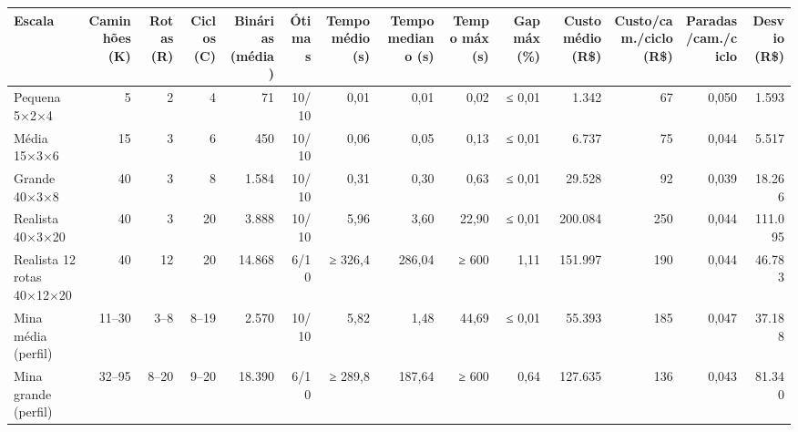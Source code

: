 \begin{tabular}{lrrrrrrrrrrrrr}
\toprule
Escala & Caminhões (K) & Rotas (R) & Ciclos (C) & Binárias (média) & Ótimas & Tempo médio (s) & Tempo mediano (s) & Tempo máx (s) & Gap máx (\%) & Custo médio (R\$) & Custo/cam./ciclo (R\$) & Paradas/cam./ciclo & Desvio (R\$) \\
\midrule
Pequena 5×2×4 & 5 & 2 & 4 & 71 & 10/10 & 0,01 & 0,01 & 0,02 & ≤ 0,01 & 1.342 & 67 & 0,050 & 1.593 \\
Média 15×3×6 & 15 & 3 & 6 & 450 & 10/10 & 0,06 & 0,05 & 0,13 & ≤ 0,01 & 6.737 & 75 & 0,044 & 5.517 \\
Grande 40×3×8 & 40 & 3 & 8 & 1.584 & 10/10 & 0,31 & 0,30 & 0,63 & ≤ 0,01 & 29.528 & 92 & 0,039 & 18.266 \\
Realista 40×3×20 & 40 & 3 & 20 & 3.888 & 10/10 & 5,96 & 3,60 & 22,90 & ≤ 0,01 & 200.084 & 250 & 0,044 & 111.095 \\
Realista 12 rotas 40×12×20 & 40 & 12 & 20 & 14.868 & 6/10 & ≥ 326,4 & 286,04 & ≥ 600 & 1,11 & 151.997 & 190 & 0,044 & 46.783 \\
Mina média (perfil) & 11–30 & 3–8 & 8–19 & 2.570 & 10/10 & 5,82 & 1,48 & 44,69 & ≤ 0,01 & 55.393 & 185 & 0,047 & 37.188 \\
Mina grande (perfil) & 32–95 & 8–20 & 9–20 & 18.390 & 6/10 & ≥ 289,8 & 187,64 & ≥ 600 & 0,64 & 127.635 & 136 & 0,043 & 81.340 \\
\bottomrule
\end{tabular}
